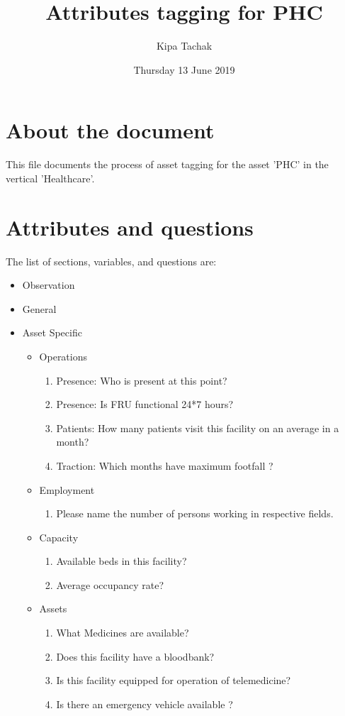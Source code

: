\documentclass[oneside]{article}
\title{Attributes tagging for PHC}
\author{Kipa Tachak}
\date{Thursday 13 June 2019}
\begin{document}
\maketitle

\section{About the document}
This file documents the process of asset tagging for the asset 'PHC' in the
vertical 'Healthcare'.

\section{Attributes and questions}
The list of sections, variables, and questions are:
    \begin{itemize}
    \item Observation
    \item General
    \item Asset Specific
    \begin{itemize}
\item Operations
\begin{enumerate}
\item Presence: Who is present at this point?
\item Presence: Is FRU functional 24*7 hours?
\item Patients: How many patients visit this facility on an average in a month?
\item Traction: Which months have maximum footfall ?
\end{enumerate}

\item Employment
\begin{enumerate}
\item  Please name the number of persons working in respective fields.
\end{enumerate}

\item Capacity
\begin{enumerate}
\item  Available beds in this facility?
\item  Average occupancy rate?
\end{enumerate}

\item Assets
\begin{enumerate}
\item  What Medicines are available?
\item  Does this facility have a bloodbank?
\item  Is this facility equipped for operation of telemedicine?
\item  Is there an emergency vehicle available ?
\end{enumerate}


\end{itemize}
\end{itemize}
\end{document}

